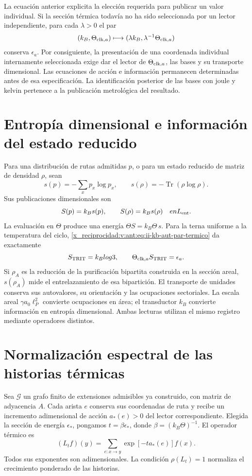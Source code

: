 La ecuación anterior explicita la elección requerida para publicar un
valor individual. Si la sección térmica todavía no ha sido seleccionada
por un lector independiente, para cada \(\lambda>0\) el par
\[
 (k_B,\Theta_{{\rm clk},a})
 \longmapsto(\lambda k_B,\lambda^{-1}\Theta_{{\rm clk},a})
\]
conserva \(\epsilon_a\). Por consiguiente, la presentación de una
coordenada individual internamente seleccionada exige dar el lector de
\(\Theta_{{\rm clk},a}\), las bases y su transporte dimensional.
Las ecuaciones de acción e información permanecen determinadas antes
de esa especificación. La identificación posterior de las bases con
joule y kelvin pertenece a la publicación metrológica del resultado.

\section{Entropía dimensional e información del estado reducido}

Para una distribución de rutas admitidas \(p\), o para un estado
reducido de matriz de densidad \(\rho\), sean
\[
 s(p)=-\sum_xp_x\log p_x,\qquad
 s(\rho)=-\operatorname{Tr}(\rho\log\rho).
\]
Sus publicaciones dimensionales son
\begin{equation}
 S(p)=k_Bs(p),\qquad S(\rho)=k_Bs(\rho)
 \quad\text{en }\mathcal L_{\rm ent}.
 \label{x_reciprocidad:v:ant:eq:ii-kb-aut-entropia}
\end{equation}
La evaluación en \(\Theta\) produce una energía
\(\Theta S=k_B\Theta\,s\). Para la terna uniforme a la temperatura
del ciclo, \eqref{x_reciprocidad:v:ant:eq:ii-kb-aut-par-termico} da exactamente
\[
 S_{\rm TRIT}=k_B\log3,\qquad
 \Theta_{{\rm clk},a}S_{\rm TRIT}=\epsilon_a.
\]
Si \(\rho_A\) es la reducción de la purificación bipartita
construida en la sección areal, \(s(\rho_A)\) mide el entrelazamiento
de esa bipartición. El transporte de unidades conserva sus
autovalores, su orientación y las ocupaciones sectoriales. La escala
areal \(\gamma a_0\ell_P^2\) convierte ocupaciones en área; el
transductor \(k_B\) convierte información en entropía dimensional.
Ambas lecturas utilizan el mismo registro mediante operadores distintos.

\section{Normalización espectral de las historias térmicas}

Sea \(\mathcal G\) un grafo finito de extensiones admisibles ya
construido, con matriz de adyacencia \(A\). Cada arista \(e\) conserva
sus coordenadas de ruta y recibe un incremento adimensional de acción
\(a_*(e)>0\) del lector correspondiente. Elegida la sección de energía
\(\epsilon_*\), pongamos \(t=\beta\epsilon_*\), donde
\(\beta=(k_B\Theta)^{-1}\). El operador térmico es
\begin{equation}
 (L_tf)(y)=\sum_{e:x\to y}\exp[-t a_*(e)]f(x).
 \label{x_reciprocidad:v:ant:eq:ii-kb-aut-operador}
\end{equation}
Todos sus exponentes son adimensionales. La condición
\(\rho(L_t)=1\) normaliza el crecimiento ponderado de las historias.

